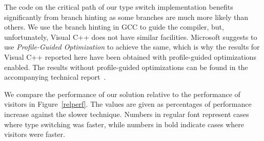 \noindent
The code on the critical path of our type switch implementation benefits 
significantly from branch hinting as some branches are much more likely than 
others. We use the branch hinting in GCC to guide the compiler, but, 
unfortunately, Visual C++ does not have similar facilities. Microsoft suggests 
to use \emph{Profile-Guided Optimization} to achieve the same, which is why the 
results for Visual C++ reported here have been obtained with profile-guided 
optimizations enabled. The results without profile-guided optimizations can be 
found in the accompanying technical report~\cite[]{TR}.

We compare the performance of our solution relative to the performance of visitors in 
Figure~\ref{relperf}. The values are given as percentages of performance increase 
against the slower technique. Numbers in regular font represent cases where type 
switching was faster, while numbers in bold indicate cases where visitors 
were faster.

